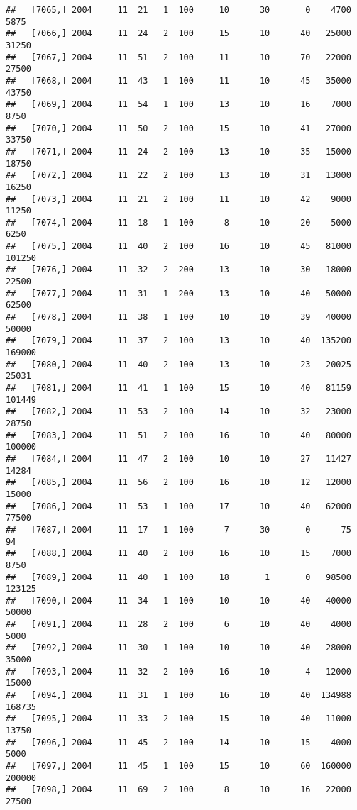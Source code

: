 \documentclass{article}\usepackage[]{graphicx}\usepackage[]{color}
\makeatletter
\newenvironment{kframe}{%
 \def\at@end@of@kframe{}%
 \ifinner\ifhmode%
  \def\at@end@of@kframe{\end{minipage}}%
  \begin{minipage}{\columnwidth}%
 \fi\fi%
 \def\FrameCommand##1{\hskip\@totalleftmargin \hskip-\fboxsep
 \colorbox{shadecolor}{##1}\hskip-\fboxsep
     \hskip-\linewidth \hskip-\@totalleftmargin \hskip\columnwidth}%
 \MakeFramed {\advance\hsize-\width
   \@totalleftmargin\z@ \linewidth\hsize
   \@setminipage}}%
 {\par\unskip\endMakeFramed%
 \at@end@of@kframe}
\newenvironment{knitrout}{}{} %
\makeatother
\begin{document}
\begin{knitrout}
\begin{kframe}
\begin{verbatim}
##   [7065,] 2004     11  21   1  100     10      30       0    4700    5875
##   [7066,] 2004     11  24   2  100     15      10      40   25000   31250
##   [7067,] 2004     11  51   2  100     11      10      70   22000   27500
##   [7068,] 2004     11  43   1  100     11      10      45   35000   43750
##   [7069,] 2004     11  54   1  100     13      10      16    7000    8750
##   [7070,] 2004     11  50   2  100     15      10      41   27000   33750
##   [7071,] 2004     11  24   2  100     13      10      35   15000   18750
##   [7072,] 2004     11  22   2  100     13      10      31   13000   16250
##   [7073,] 2004     11  21   2  100     11      10      42    9000   11250
##   [7074,] 2004     11  18   1  100      8      10      20    5000    6250
##   [7075,] 2004     11  40   2  100     16      10      45   81000  101250
##   [7076,] 2004     11  32   2  200     13      10      30   18000   22500
##   [7077,] 2004     11  31   1  200     13      10      40   50000   62500
##   [7078,] 2004     11  38   1  100     10      10      39   40000   50000
##   [7079,] 2004     11  37   2  100     13      10      40  135200  169000
##   [7080,] 2004     11  40   2  100     13      10      23   20025   25031
##   [7081,] 2004     11  41   1  100     15      10      40   81159  101449
##   [7082,] 2004     11  53   2  100     14      10      32   23000   28750
##   [7083,] 2004     11  51   2  100     16      10      40   80000  100000
##   [7084,] 2004     11  47   2  100     10      10      27   11427   14284
##   [7085,] 2004     11  56   2  100     16      10      12   12000   15000
##   [7086,] 2004     11  53   1  100     17      10      40   62000   77500
##   [7087,] 2004     11  17   1  100      7      30       0      75      94
##   [7088,] 2004     11  40   2  100     16      10      15    7000    8750
##   [7089,] 2004     11  40   1  100     18       1       0   98500  123125
##   [7090,] 2004     11  34   1  100     10      10      40   40000   50000
##   [7091,] 2004     11  28   2  100      6      10      40    4000    5000
##   [7092,] 2004     11  30   1  100     10      10      40   28000   35000
##   [7093,] 2004     11  32   2  100     16      10       4   12000   15000
##   [7094,] 2004     11  31   1  100     16      10      40  134988  168735
##   [7095,] 2004     11  33   2  100     15      10      40   11000   13750
##   [7096,] 2004     11  45   2  100     14      10      15    4000    5000
##   [7097,] 2004     11  45   1  100     15      10      60  160000  200000
##   [7098,] 2004     11  69   2  100      8      10      16   22000   27500

\end{verbatim}
\end{kframe}
\end{knitrout}
\end{document}
